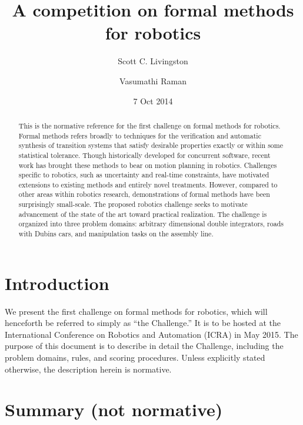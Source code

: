 \documentclass{amsart}
\theoremstyle{definition}
\begin{document}
\title{A competition on formal methods for robotics}
\author{Scott C. Livingston}
\author{Vasumathi Raman}
\date{7 Oct 2014}
\begin{abstract}
This is the normative reference for the first challenge on formal methods for
robotics.  Formal methods refers broadly to techniques for the verification and
automatic synthesis of transition systems that satisfy desirable properties
exactly or within some statistical tolerance.  Though historically developed for
concurrent software, recent work has brought these methods to bear on motion
planning in robotics.  Challenges specific to robotics, such as uncertainty and
real-time constraints, have motivated extensions to existing methods and
entirely novel treatments.  However, compared to other areas within robotics
research, demonstrations of formal methods have been surprisingly small-scale.
The proposed robotics challenge seeks to motivate advancement of the state of
the art toward practical realization.  The challenge is organized into three
problem domains: arbitrary dimensional double integrators, roads with Dubins
cars, and manipulation tasks on the assembly line.
\end{abstract}
\maketitle


\section{Introduction}

We present the first challenge on formal methods for robotics, which will
henceforth be referred to simply as ``the Challenge.''  It is to be hosted at
the International Conference on Robotics and Automation ({ICRA}) in May 2015.
The purpose of this document is to describe in detail the Challenge, including
the problem domains, rules, and scoring procedures.  Unless explicitly stated
otherwise, the description herein is normative.

\section{Summary (not normative)}
\end{document}
